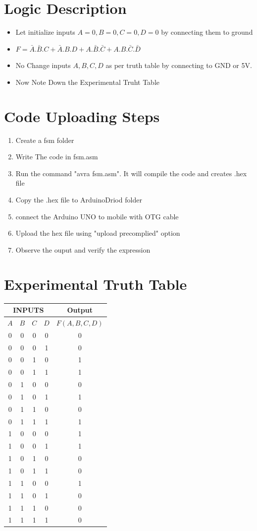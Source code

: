 \documentclass[a4paper,12pt]{article}
\begin{document}
\section*{Logic Description}
\begin{itemize}
        \item Let initialize inputs $A=0,B=0,C=0,D=0$ by connecting them to ground
        \item $F = \bar{A}.\bar{B}.C + \bar{A}.B.D + A.\bar{B}.\bar{C} + A.B.\bar{C}.\bar{D} $
	\item No Change inputs $A,B,C,D$ as per truth table by connecting to GND or 5V.
	\item Now Note Down the Experimental Truht Table
\end{itemize}
\section*{Code Uploading Steps}
\begin{enumerate}
        \item Create a fsm folder
        \item Write The code in fsm.asm
        \item Run the command "avra fsm.asm". It will compile the code and creates .hex file
        \item Copy the .hex file to ArduinoDriod folder
        \item connect the Arduino UNO to mobile with OTG cable
        \item Upload the hex file using "upload precomplied" option
        \item Observe the ouput and verify the expression
\end{enumerate}
\section*{Experimental Truth Table}
\begin{center}
\begin{tabular}{|c|c|c|c|c|}
\hline
\multicolumn{4}{|c|}{\textbf{INPUTS}} & \textbf{Output} \\
\hline
$A$ & $B$ & $C$ & $D$ & $F(A,B,C,D)$ \\
\hline
0 & 0 & 0 & 0 & 0 \\ 
0 & 0 & 0 & 1 & 0 \\ 
0 & 0 & 1 & 0 & 1 \\ 
0 & 0 & 1 & 1 & 1 \\ 
0 & 1 & 0 & 0 & 0 \\ 
0 & 1 & 0 & 1 & 1 \\ 
0 & 1 & 1 & 0 & 0 \\ 
0 & 1 & 1 & 1 & 1 \\ 
1 & 0 & 0 & 0 & 1 \\ 
1 & 0 & 0 & 1 & 1 \\ 
1 & 0 & 1 & 0 & 0 \\ 
1 & 0 & 1 & 1 & 0 \\ 
1 & 1 & 0 & 0 & 1 \\ 
1 & 1 & 0 & 1 & 0 \\ 
1 & 1 & 1 & 0 & 0 \\ 
1 & 1 & 1 & 1 & 0 \\ 
\hline
\end{tabular}
\end{center}
\end{document}
